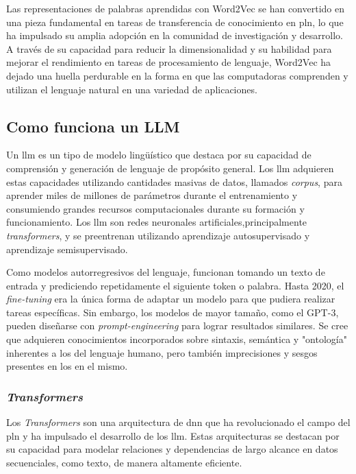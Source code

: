 Las representaciones de palabras aprendidas con Word2Vec se han convertido en una pieza fundamental en tareas de transferencia de conocimiento en \acrshort{pln}, lo que ha impulsado su amplia adopción en la comunidad de investigación y desarrollo. A través de su capacidad para reducir la dimensionalidad y su habilidad para mejorar el rendimiento en tareas de procesamiento de lenguaje, Word2Vec ha dejado una huella perdurable en la forma en que las computadoras comprenden y utilizan el lenguaje natural en una variedad de aplicaciones.

\subsection{Como funciona un LLM}

Un \acrfull{llm} es un tipo de modelo lingüístico que destaca por su capacidad de comprensión y generación de lenguaje de propósito general. Los \acrshort{llm} adquieren estas capacidades utilizando cantidades masivas de datos, llamados \textit{corpus}, para aprender miles de millones de parámetros durante el entrenamiento y consumiendo grandes recursos computacionales durante su formación y funcionamiento\cite{radford_language_2019}. Los \acrshort{llm} son redes neuronales artificiales,principalmente \textit{transformers}\cite{Nvidia_Transformers}, y se preentrenan utilizando aprendizaje autosupervisado y aprendizaje semisupervisado.

Como modelos autorregresivos del lenguaje, funcionan tomando un texto de entrada y prediciendo repetidamente el siguiente token o palabra\cite{bowman2023eight}. Hasta 2020, el \textit{fine-tuning} era la única forma de adaptar un modelo para que pudiera realizar tareas específicas. Sin embargo, los modelos de mayor tamaño, como el GPT-3, pueden diseñarse con \textit{prompt-engineering} para lograr resultados similares. Se cree que adquieren conocimientos incorporados sobre sintaxis, semántica y "ontología" inherentes a los del lenguaje humano, pero también imprecisiones y sesgos presentes en los en el mismo.

\subsubsection{\textit{Transformers}}

Los \textit{Transformers} son una arquitectura de \acrfull{dnn} que ha revolucionado el campo del \acrfull{pln} y ha impulsado el desarrollo de los \acrfull{llm}. Estas arquitecturas se destacan por su capacidad para modelar relaciones y dependencias de largo alcance en datos secuenciales, como texto, de manera altamente eficiente\cite{Nvidia_Transformers, turner2023introduction}.

